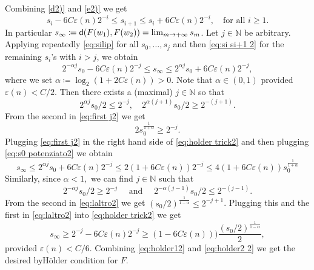 \documentclass[11pt]{article}
\newcommand{\eps}{\varepsilon}
\newcommand{\nn}{\mathbb{N}}
\newcommand{\sfd}{{\sf d}}
\theoremstyle{plain}
\theoremstyle{definition}
\numberwithin{equation}{section}
\begin{document}
Combining \ref{d2)} and \ref{e2)} we get
\begin{equation}\label{eq:si si+1 2}
   s_i- 6C\eps(n)2^{-i}\le  s_{i+1}\le s_i+ 6C\eps(n)2^{-i}, \quad \text{for all $i\ge 1.$}
\end{equation}
In particular $s_\infty\coloneqq \sfd(F(w_1),F(w_2))= \lim_{m\to +\infty} s_m$.
Let $j\in \nn$ be arbitrary. Applying repeatedly \eqref{eq:silip} for all $s_0,\dots,s_j$ and then \eqref{eq:si si+1 2} for the remaining $s_i$'s with $i>j$, we obtain
\begin{equation}\label{eq:holder trick2}
   2^{-\alpha j} s_0 - 6C \eps(n)2^{-j}\le  s_\infty\le 2^{\alpha j} s_0 + 6C \eps(n)2^{-j},
\end{equation}
where we set $\alpha\coloneqq \log_2(1+2C \eps(n))>0.$ Note that $\alpha\in(0,1)$ provided $\eps(n)<C/2.$ 
Then there exists a (maximal) $j\in\nn$ so that 
\begin{equation} \label{eq:first j2}
    2^{\alpha j}s_0/2\le 2^{-j}, \quad 2^{\alpha(j+1)}s_0/2\ge 2^{-(j+1)}.
\end{equation}
From the second in \eqref{eq:first j2} we get
\begin{equation}\label{eq:s0 potenziato2}
    2s_0^\frac{1}{1+\alpha}\ge 2^{-j}.
\end{equation}
Plugging \eqref{eq:first j2}  in the right hand side of \eqref{eq:holder trick2} and then plugging \eqref{eq:s0 potenziato2} we obtain
\begin{equation}\label{eq:holder12}
     s_\infty\le 2^{\alpha j} s_0 + 6C \eps(n)2^{-j}\le 2(1+6C \eps(n))2^{-j} \le 4(1+6C \eps(n))s_0^\frac{1}{1+\alpha}
\end{equation}
Similarly, since $\alpha<1,$ we can find $j\in \nn$ such that
\begin{equation}\label{eq:laltro2}
    2^{-\alpha j}s_0/2\ge 2^{-j} \quad \text{ and } \quad 2^{-\alpha (j-1)}s_0/2\le 2^{-(j-1)}.
\end{equation}
From the second in \eqref{eq:laltro2}  we get $(s_0/2)^\frac{1}{1-\alpha}\le 2^{-j+1}$.
Plugging this and the first in \eqref{eq:laltro2} into \eqref{eq:holder trick2} we get
\begin{equation}\label{eq:holder2 2}
     s_\infty\ge  2^{-j} - 6C \eps(n)2^{-j}\ge (1-6C \eps(n)))\frac{(s_0/2)^\frac{1}{1-\alpha}}2,
\end{equation}
provided $\eps(n)<C/6.$
Combining \eqref{eq:holder12} and \eqref{eq:holder2 2}  we get the desired byH\"older condition for $F.$
\end{document}
